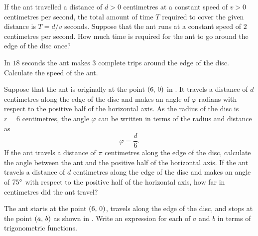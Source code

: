 \documentclass[a4paper,oneside,12pt]{article}
\begin{document}
\begin{problem}
\begin{packedenum}
  \item\label{subprob:trigonometric:ant_time}
    If the ant travelled a distance of $d > 0$ centimetres at a
    constant speed of $v > 0$ centimetres per second, the total amount
    of time $T$ required to cover the given distance is $T = d / v$
    seconds.  Suppose that the ant runs at a constant speed of $2$
    centimetres per second.  How much time is required for the ant to
    go around the edge of the disc once?

  \item\label{subprob:trigonometric:ant_speed}
    In $18$ seconds the ant makes $3$ complete trips around the edge
    of the disc.  Calculate the speed of the ant.

  \item\label{subprob:trigonometric:ant_angle}
    Suppose that the ant is originally at the point $\left\lparen{6},\, {0}\right\rparen$ in
    .  It travels a distance of
    $d$ centimetres along the edge of the disc and makes an angle of
    $\varphi$ radians with respect to the positive half of the
    horizontal axis.  As the radius of the disc is $r = 6$
    centimetres, the angle $\varphi$ can be written in terms of the
    radius and distance as
    \[
    \varphi
    =
    \frac{d}{6}.
    \]
    If the ant travels a distance of $\pi$ centimetres along the edge
    of the disc, calculate the angle between the ant and the positive
    half of the horizontal axis.  If the ant travels a distance of $d$
    centimetres along the edge of the disc and makes an angle of
    ${75}^{\circ}$ with respect to the positive half of the horizontal
    axis, how far in centimetres did the ant travel?

  \item\label{subprob:trigonometric:ant_x_y_distances}
    The ant starts at the point $\left\lparen{6},\, {0}\right\rparen$, travels along the edge
    of the disc, and stops at the point $\left\lparen{a},\, {b}\right\rparen$ as shown in
    .  Write an expression for
    each of $a$ and $b$ in terms of trigonometric functions.
  \end{packedenum}
\end{problem}
\end{document}
